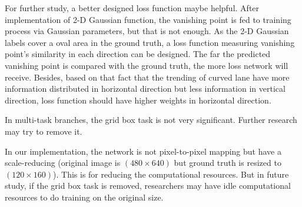 \begin{spacing}{1.5}
For further study, a better designed loss function maybe helpful. After implementation of 2-D Gaussian function, the vanishing point is fed to training process via Gaussian parameters, but that is not enough. As the 2-D Gaussian labels cover a oval area in the ground truth, a loss function measuring vanishing point's similarity in each direction can be designed. The far the predicted vanishing point is compared with the ground truth, the more loss network will receive. Besides, based on that fact that the trending of curved lane have more information distributed in horizontal direction but less information in vertical direction, loss function should have higher weights in horizontal direction.

In multi-task branches, the grid box task is not very significant. Further research may try to remove it.

In our implementation, the network is not pixel-to-pixel mapping but have a scale-reducing (original image is $(480 \times 640)$ but ground truth is resized to $(120 \times 160)$). This is for reducing the computational resources. But in future study, if the grid box task is removed, researchers may have idle computational resources to do training on the original size. 




\end{spacing}
\newpage
